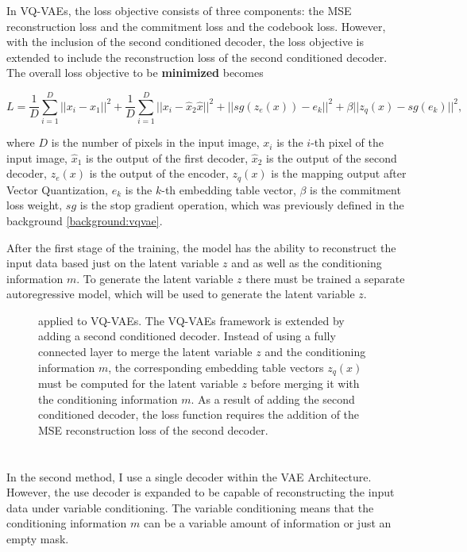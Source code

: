 In VQ-VAEs, the loss objective consists of three components: the MSE
reconstruction loss and the commitment loss and the codebook loss. However,
with the inclusion of the second conditioned decoder, the loss objective is
extended to include the reconstruction loss of the second conditioned decoder.
The overall loss objective to be \textbf{minimized} becomes

\[ L = \frac{1}{D} \sum_{i=1}^{D} ||x_i - \hat{x}_1 ||^2 + \frac{1}{D} \sum_{i=1}^{D} || x_i - \hat{x}_2 \hat{x} ||^2 + || sg(z_e(x)) - e_k ||^2 + \beta || z_q(x) - sg(e_k) ||^2 , \]

where $D$ is the number of pixels in the input image, $x_i$ is the $i$-th pixel
of the input image, $\hat{x}_1$ is the output of the first decoder, $\hat{x}_2$
is the output of the second decoder, $z_e(x)$ is the output of the encoder,
$z_q(x)$ is the mapping output after Vector Quantization, $e_k$ is the $k$-th
embedding table vector, $\beta$ is the commitment loss weight, $sg$ is the stop
gradient operation, which was previously defined in the background \autoref{background:vqvae}.

After the first stage of the training, the model has the ability to reconstruct
the input data based just on the latent variable $z$ and as well as the
conditioning information $m$. To generate the latent variable $z$ there must be
trained a separate autoregressive model, which will be used to generate the
latent variable $z$.

\begin{figure}[H]
    \centering
    
    \caption[ applied to VQ-VAEs.]%
    {
         applied to VQ-VAEs. The VQ-VAEs framework is extended by adding a second conditioned decoder. Instead of using a fully connected layer to merge the latent variable $z$ and the conditioning information $m$, the corresponding embedding table vectors $z_q(x)$ must be computed for the latent variable $z$ before merging it with the conditioning information $m$. As a result of adding the second conditioned decoder, the loss function requires the addition of the MSE reconstruction loss of the second decoder.
    }\label{SCVQVAE2DFigure}
\end{figure}

\section{}

In the second method, I use a single decoder within the VAE Architecture.
However, the use decoder is expanded to be capable of reconstructing the input
data under variable conditioning. The variable conditioning means that the
conditioning information $m$ can be a variable amount of information or just an
empty mask.

